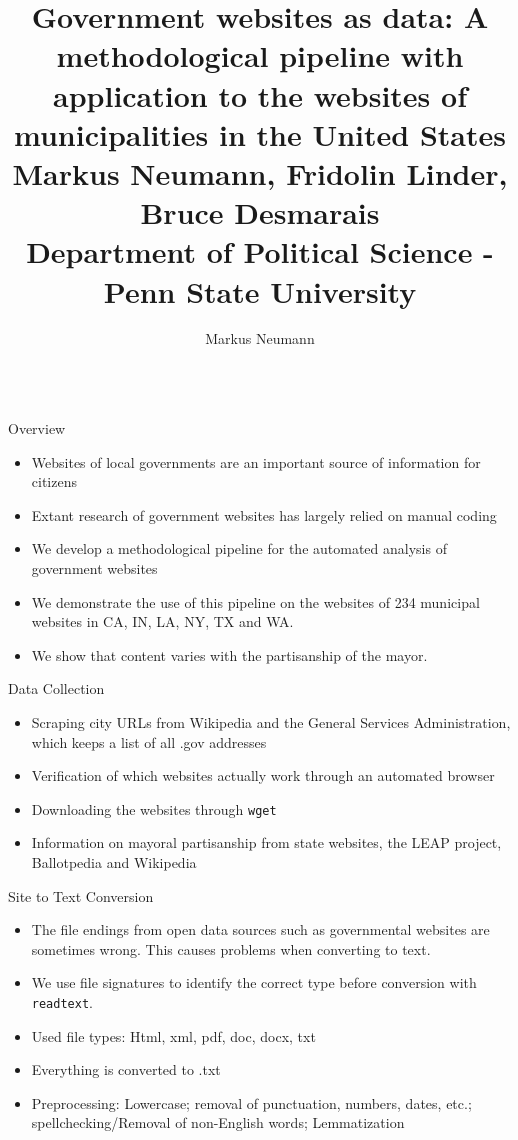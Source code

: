\documentclass{beamer}
\author[mvn5218@psu.edu]{Markus Neumann}
\title{Government websites as data: A methodological pipeline with application to the websites of municipalities in the United States \\ \vspace{10mm} \small{Markus Neumann,  Fridolin Linder,  Bruce Desmarais \\ Department of Political Science - Penn State University}}
\institute{The Pennsylvania State University}
\begin{document}
\beamertemplatenavigationsymbolsempty
\begin{frame}[fragile]
\begin{columns}[T]

\begin{column}{.4\textwidth}

\begin{block}{Overview}
\begin{itemize}
\item Websites of local governments are an important source of information for citizens
\item Extant research of government websites has largely relied on manual coding
\item We develop a methodological pipeline for the automated analysis of government websites
\item We demonstrate the use of this pipeline on the websites of 234 municipal websites in CA, IN, LA, NY, TX and WA. 
\item We show that content varies with the partisanship of the mayor.
\end{itemize}
\end{block}

\begin{block}{Data Collection}
\begin{itemize}
\item Scraping city URLs from Wikipedia and the General Services Administration, which keeps a list of all .gov addresses
\item Verification of which websites actually work through an automated browser
\item Downloading the websites through \texttt{wget}
\item Information on mayoral partisanship from state websites, the LEAP project, Ballotpedia and Wikipedia
\end{itemize}
\end{block}

\begin{block}{Site to Text Conversion}
\begin{itemize}
\item The file endings from open data sources such as governmental websites are sometimes wrong. This causes problems when converting to text.
\item We use file signatures to identify the correct type before conversion with \texttt{readtext}.
\item Used file types: Html, xml, pdf, doc, docx, txt
\item Everything is converted to .txt
\item Preprocessing: Lowercase; removal of punctuation, numbers, dates, etc.; spellchecking/Removal of non-English words; Lemmatization
\end{itemize}
\end{block}


\end{column}
\end{columns}
\end{frame}
\end{document}
